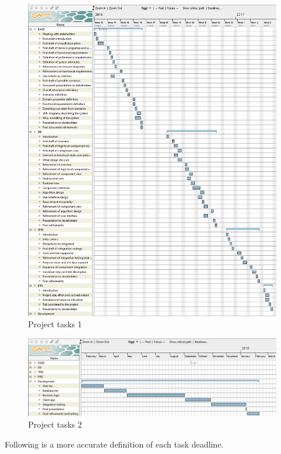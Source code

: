 \begin{figure}[H]
	\centerline{
		\includegraphics[width=500px]{../Datas/images/tasks-schedule-1.png}
	}
	\caption{Project tasks 1}
		\label{fig:tasks-1}
\end{figure}

\begin{figure}[H]
	\centerline{
		\includegraphics[width=500px]{../Datas/images/tasks-schedule-2.png}
	}
	\caption{Project tasks 2}
		\label{fig:tasks-2}
\end{figure}

\newpage

Following is a more accurate definition of each task deadline.

